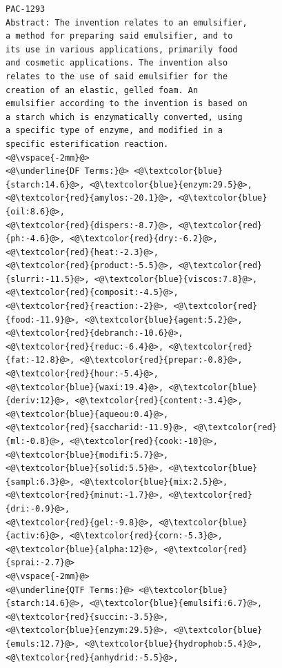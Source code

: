 \begin{figure}[t!]
\begin{framed}
\vspace*{-2ex}
  \centering
 \begin{lstlisting}[basicstyle=\scriptsize\ttfamily , linewidth=\columnwidth,breaklines=true] 
PAC-1293
Abstract: The invention relates to an emulsifier, 
a method for preparing said emulsifier, and to 
its use in various applications, primarily food 
and cosmetic applications. The invention also 
relates to the use of said emulsifier for the 
creation of an elastic, gelled foam. An 
emulsifier according to the invention is based on 
a starch which is enzymatically converted, using 
a specific type of enzyme, and modified in a 
specific esterification reaction.
<@\vspace{-2mm}@>
<@\underline{DF Terms:}@> <@\textcolor{blue}{starch:14.6}@>, <@\textcolor{blue}{enzym:29.5}@>, <@\textcolor{red}{amylos:-20.1}@>, <@\textcolor{blue}{oil:8.6}@>,
<@\textcolor{red}{dispers:-8.7}@>, <@\textcolor{red}{ph:-4.6}@>, <@\textcolor{red}{dry:-6.2}@>, <@\textcolor{red}{heat:-2.3}@>, 
<@\textcolor{red}{product:-5.5}@>, <@\textcolor{red}{slurri:-11.5}@>, <@\textcolor{blue}{viscos:7.8}@>, <@\textcolor{red}{composit:-4.5}@>, 
<@\textcolor{red}{reaction:-2}@>, <@\textcolor{red}{food:-11.9}@>, <@\textcolor{blue}{agent:5.2}@>, <@\textcolor{red}{debranch:-10.6}@>, 
<@\textcolor{red}{reduc:-6.4}@>, <@\textcolor{red}{fat:-12.8}@>, <@\textcolor{red}{prepar:-0.8}@>, <@\textcolor{red}{hour:-5.4}@>, 
<@\textcolor{blue}{waxi:19.4}@>, <@\textcolor{blue}{deriv:12}@>, <@\textcolor{red}{content:-3.4}@>, <@\textcolor{blue}{aqueou:0.4}@>, 
<@\textcolor{red}{saccharid:-11.9}@>, <@\textcolor{red}{ml:-0.8}@>, <@\textcolor{red}{cook:-10}@>, <@\textcolor{blue}{modifi:5.7}@>, 
<@\textcolor{blue}{solid:5.5}@>, <@\textcolor{blue}{sampl:6.3}@>, <@\textcolor{blue}{mix:2.5}@>, <@\textcolor{red}{minut:-1.7}@>, <@\textcolor{red}{dri:-0.9}@>, 
<@\textcolor{red}{gel:-9.8}@>, <@\textcolor{blue}{activ:6}@>, <@\textcolor{red}{corn:-5.3}@>, <@\textcolor{blue}{alpha:12}@>, <@\textcolor{red}{sprai:-2.7}@> 
<@\vspace{-2mm}@>
<@\underline{QTF Terms:}@> <@\textcolor{blue}{starch:14.6}@>, <@\textcolor{blue}{emulsifi:6.7}@>, <@\textcolor{red}{succin:-3.5}@>, 
<@\textcolor{blue}{enzym:29.5}@>, <@\textcolor{blue}{emuls:12.7}@>, <@\textcolor{blue}{hydrophob:5.4}@>, <@\textcolor{red}{anhydrid:-5.5}@>, 

\end{lstlisting}
\end{framed}
\end{figure}
